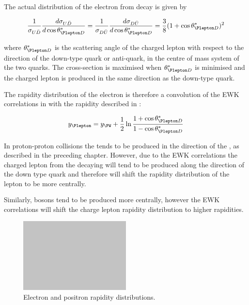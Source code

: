 The actual distribution of the electron from \PWpm decay is given by\cite{}

\begin{equation}
  \frac{1}{\sigma_{U\bar{D}}}
  \frac{d \sigma_{U\bar{D}}}{d \cos \theta_{\Plepton D}^{\ast}}
  =
  \frac{1}{\sigma_{D\bar{U}}}
  \frac{d \sigma_{D\bar{U}}}{d \cos \theta_{\Plepton D}^{\ast}}
  =
  \frac{3}{8}(1+\cos \theta_{\Plepton D}^{\ast})^2
  \label{wbos:lepton}
\end{equation}

where $\theta_{\Plepton D}^{\ast}$ is the scattering angle of the charged
lepton with respect to the direction of the down-type quark or anti-quark, in
the centre of mass system of the two quarks. The cross-section is maximised when
$\theta_{\Plepton D}^{\ast}$ is minimised and the charged lepton is produced in
the same direction as the down-type quark.

The rapidity distribution of the electron is therefore a convolution of the
\ac{EWK} correlations in  with the \PW rapidity
described in :

\begin{equation}
  y_{\Plepton} = 
  y_{\PW} +
  \frac{1}{2}
  \ln
  \frac{1 + \cos \theta_{\Plepton D}^{\ast}}{1 - \cos \theta_{\Plepton D}^{\ast}}
  \label{wbos:leptonfull}
\end{equation}

In proton-proton collisions the \PWp tends to be produced in the direction
of the \Pup, as described in the preceding chapter.  
However, due to the EWK correlations the charged lepton from the decaying \PWp
will tend to be produced along the direction of the down type quark and
therefore will shift the rapidity distribution of the lepton to be more
centrally.\cite{}

Similarly, \PWm bosons tend to be produced more centrally, however the EWK
correlations will shift the charge lepton rapidity distribution to higher rapidities.

\begin{figure}[htb]
  \centering
  \includegraphics[width=0.5\textwidth]{placeholder}
  \caption{Electron and positron rapidity distributions.}
  \label{wbos:leptonrapidity}
\end{figure}

